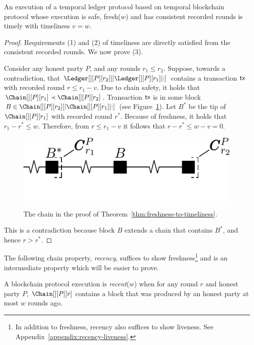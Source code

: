 \begin{theorem} \label{thm:freshness-to-timeliness}
  An execution of a temporal ledger protocol based on
  temporal blockchain protocol
  whose execution is safe, fresh($w$) and has consistent recorded rounds is timely with timeliness $v = w$.
\end{theorem}
\begin{proof}
  Requirements (1) and (2) of timeliness are directly satisfied from
  the consistent recorded rounds.
  We now prove (3).

  Consider any honest party $P$, and any rounds $r_1 \leq r_2$.
  Suppose, towards a contradiction, that $\Ledger[][P][r_2][|\Ledger[][P][r_1]|{:}]$
  contains a transaction $\textsf{tx}$ with recorded round $r \leq r_1 - v$.
  Due to chain safety, it holds that $\Chain[][P][r_1] \prec \Chain[][P][r_2]$.
  Transaction $\textsf{tx}$ is in some block $B \in \Chain[][P][r_2][|\Chain[][P][r_1]|{:}]$
  (see Figure~\ref{fig:freshness-to-timeliness}).
  Let $B^*$ be the tip of $\Chain[][P][r_1]$ with recorded round $r^*$.
  Because of freshness, it holds that $r_1 - r^* \leq w$.
  Therefore, from $r \leq r_1 - v$ it follows that $r - r^* \leq w - v = 0$.

  \iflncs
    \begin{figure}
      \centering
      \includegraphics[width=0.5\columnwidth,keepaspectratio]{figures/freshness-timeliness.pdf}
      \caption{The chain in the proof of Theorem~\ref{thm:freshness-to-timeliness}.}
      \label{fig:freshness-to-timeliness}
    \end{figure}
  \fi

  This is a contradiction because block $B$ extends a chain that contains $B^*$,
  and hence $r > r^*$.
  \Qed
\end{proof}

The following chain property, \emph{recency}, suffices to show freshness\footnote{
  In addition to freshness, recency also suffices to show liveness.
  See Appendix~\ref{appendix:recency-liveness}.
} and is an intermediate property which will be easier to prove.

\begin{definition}[Recency]
  A blockchain protocol execution is \emph{recent}($w$)
  when for any round $r$ and honest party $P$, $\Chain[][P][r]$
  contains a block that was produced by an honest party
  at most $w$ rounds ago.
\end{definition}

